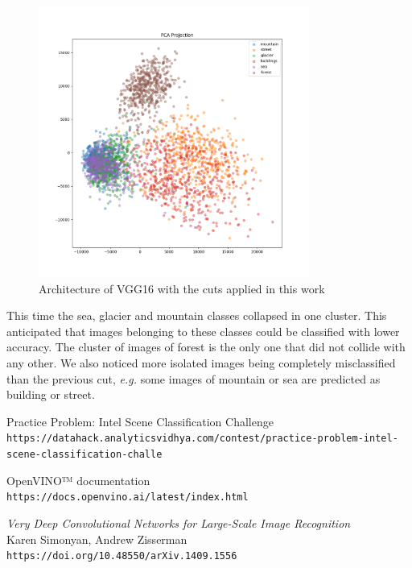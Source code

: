 \documentclass[compsoc]{IEEEtran}
\begin{document}
\begin{figure}[ht!]
\centering                                                                        
\includegraphics[width=3.5in]{../images/pca-2.png}
\captionsetup{justification=centering}                                                                                         
\caption{Architecture of VGG16 with the cuts applied in this work}
\label{fig:pca2}                                                                                                                               
\end{figure}

This time the sea, glacier and mountain classes collapsed in one cluster. This anticipated that images belonging to these classes could be classified with lower accuracy.
The cluster of images of forest is the only one that did not collide with any other.
We also noticed more isolated images being completely misclassified than the previous cut, \emph{e.g.} some images of mountain or sea are predicted as building or street.







\begin{thebibliography}{9}

Practice Problem: Intel Scene Classification Challenge \\
\texttt{https://datahack.analyticsvidhya.com/contest/practice-problem-intel-scene-classification-challe}

OpenVINO™ documentation \\
\texttt{https://docs.openvino.ai/latest/index.html}

\emph{Very Deep Convolutional Networks for Large-Scale Image Recognition} \\
Karen Simonyan, Andrew Zisserman \\
\texttt{https://doi.org/10.48550/arXiv.1409.1556}

\end{thebibliography}
\end{document}
